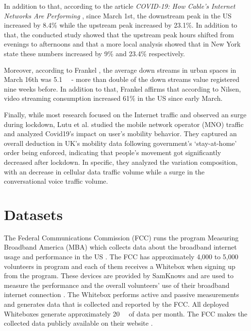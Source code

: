 \documentclass[conference,10pt]{IEEEtran}
\begin{document}
In addition to that, according to the article \textit{COVID-19: How Cable's Internet Networks Are Performing} \cite{ncta}, since March 1st, the downstream peak in the US increased by 8.4\% while the upstream peak increased by 23.1\%. In addition to that, the conducted study showed that the upstream peak hours shifted from evenings to afternoons and that a more local analysis showed that in New York state these numbers increased by 9\% and 23.4\% respectively.

Moreover, according to Frankel \cite{frankel}, the average down streams in urban spaces in March 16th was \SI{5.1}{\giga\byte} - more than double of the down streams value registered nine weeks before. In addition to that, Frankel affirms that according to Nilsen, video streaming consumption increased 61\% in the US since early March.

Finally, while most research focused on the Internet traffic and observed an surge during lockdown, Lutu et al. \cite{lutu2020mobile} studied the mobile network operator (MNO) traffic and analyzed Covid19's impact on user’s mobility behavior. They captured an overall deduction in UK’s mobility data following government’s ‘stay-at-home’ order being enforced, indicating that people’s movement got significantly decreased after lockdown. In specific, they analyzed the variation composition, with an decrease in cellular data traffic volume while a surge in the conversational voice traffic volume.

\section{Datasets}
\label{sec:datasets}


The Federal Communications Commission (FCC) runs the program Measuring Broadband America (MBA) which collects data about the broadband internet usage and performance in the US \cite{mba}. The FCC has approximately 4,000 to 5,000 volunteers in program and each of them receives a Whitebox when signing up from the program. These devices are provided by SamKnows and are used to measure the performance and the overall volunteers' use of their broadband internet connection \cite{sam}. The Whitebox performs active and passive measurements and generates data that is collected and reported by the FCC. All deployed Whiteboxes generate approximately \SI{20}{\giga\byte} of data per month. The FCC makes the collected data publicly available on their website \cite{data}.
\end{document}
